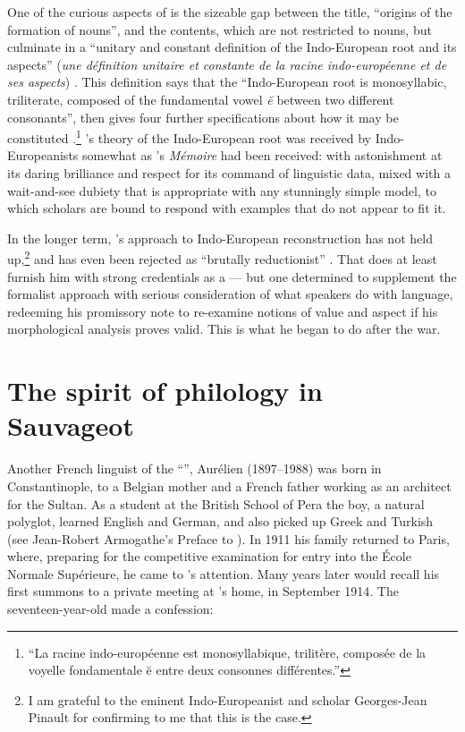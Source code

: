 \documentclass[output=paper]{langscibook}
\begin{document}
One of the curious aspects of \citet{Benveniste1935} is the sizeable gap between the title, ``origins of the formation of nouns'', and the contents, which are not restricted to nouns, but culminate in a ``unitary and constant definition of the Indo-European root and its aspects'' (\emph{une définition unitaire et constante de la racine indo-européenne et de ses aspects}) \citep[170]{Benveniste1935}. This definition says that the ``Indo-European root is monosyllabic, triliterate, composed of the fundamental vowel \emph{ĕ} between two different consonants'', then gives four further specifications about how it may be constituted \citep[170--171]{Benveniste1935}.\footnote{``La racine indo-européenne est monosyllabique, trilitère, composée de la voyelle fondamentale ĕ entre deux consonnes différentes.''} {\Benveniste}'s theory of the Indo-European root was received by Indo-Europeanists somewhat as {\Saussure}'s \emph{Mémoire} had been received: with astonishment at its daring brilliance and respect for its command of linguistic data, mixed with a wait-and-see dubiety that is appropriate with any stunningly simple model, to which scholars are bound to respond with examples that do not appear to fit it.

\largerpage[1]In the longer term, {\Benveniste}'s approach to Indo-European reconstruction has not held up,\footnote{I am grateful to the eminent Indo-Europeanist and {\Benveniste} scholar Georges-Jean Pinault for confirming to me that this is the case.} and has even been rejected as ``brutally reductionist'' \citep[560]{Dunkel1981}. That does at least furnish him with strong credentials as a  — but one determined to supplement the formalist approach with serious consideration of what speakers do with language, redeeming his \citeyear{Benveniste1935} promissory note to re-examine notions of value and aspect if his morphological analysis proves valid. This is what he began to do after the war.

\largerpage
\section{The spirit of philology in Sauvageot}
\label{sec:joseph:sauvageot}

Another French linguist of the ``'', Aurélien {\Sauvageot} (1897--1988) was born in Constantinople, to a Belgian mother and a French father working as an architect for the Sultan. As a student at the British School of Pera the boy, a natural polyglot, learned English and German, and also picked up Greek and Turkish (see Jean-Robert Armogathe's Preface to \citealt[9]{Sauvageot2013}). In 1911 his family returned to Paris, where, preparing for the competitive examination for entry into the École Normale Supérieure, he came to {\Meillet}'s attention. Many years later {\Sauvageot} would recall his first summons to a private meeting at {\Meillet}'s home, in September 1914. The seventeen-year-old made a confession:
\end{document}
